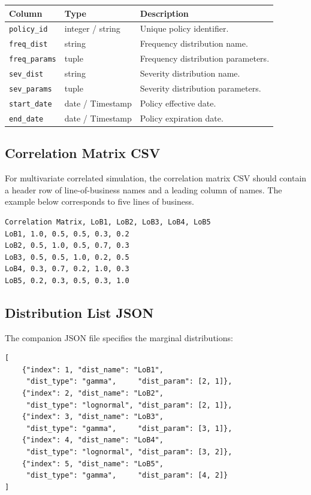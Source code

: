 \begin{longtable}{p{}p{}p{}}
\toprule
\textbf{Column} & \textbf{Type} & \textbf{Description} \\
\midrule
\endhead
\texttt{policy\_id}    & integer / string & Unique policy identifier. \\
\texttt{freq\_dist}    & string           & Frequency distribution name. \\
\texttt{freq\_params}  & tuple            & Frequency distribution parameters. \\
\texttt{sev\_dist}     & string           & Severity distribution name. \\
\texttt{sev\_params}   & tuple            & Severity distribution parameters. \\
\texttt{start\_date}   & date / Timestamp & Policy effective date. \\
\texttt{end\_date}     & date / Timestamp & Policy expiration date. \\
\bottomrule
\end{longtable}

\subsection*{Correlation Matrix CSV}

For multivariate correlated simulation, the correlation matrix CSV
should contain a header row of line-of-business names and a leading
column of names. The example below corresponds to five lines of
business.

\begin{lstlisting}[style=bashstyle]
Correlation Matrix, LoB1, LoB2, LoB3, LoB4, LoB5
LoB1, 1.0, 0.5, 0.5, 0.3, 0.2
LoB2, 0.5, 1.0, 0.5, 0.7, 0.3
LoB3, 0.5, 0.5, 1.0, 0.2, 0.5
LoB4, 0.3, 0.7, 0.2, 1.0, 0.3
LoB5, 0.2, 0.3, 0.5, 0.3, 1.0
\end{lstlisting}

\subsection*{Distribution List JSON}

The companion JSON file specifies the marginal distributions:

\begin{lstlisting}[style=bashstyle]
[
    {"index": 1, "dist_name": "LoB1",
     "dist_type": "gamma",     "dist_param": [2, 1]},
    {"index": 2, "dist_name": "LoB2",
     "dist_type": "lognormal", "dist_param": [2, 1]},
    {"index": 3, "dist_name": "LoB3",
     "dist_type": "gamma",     "dist_param": [3, 1]},
    {"index": 4, "dist_name": "LoB4",
     "dist_type": "lognormal", "dist_param": [3, 2]},
    {"index": 5, "dist_name": "LoB5",
     "dist_type": "gamma",     "dist_param": [4, 2]}
]
\end{lstlisting}


